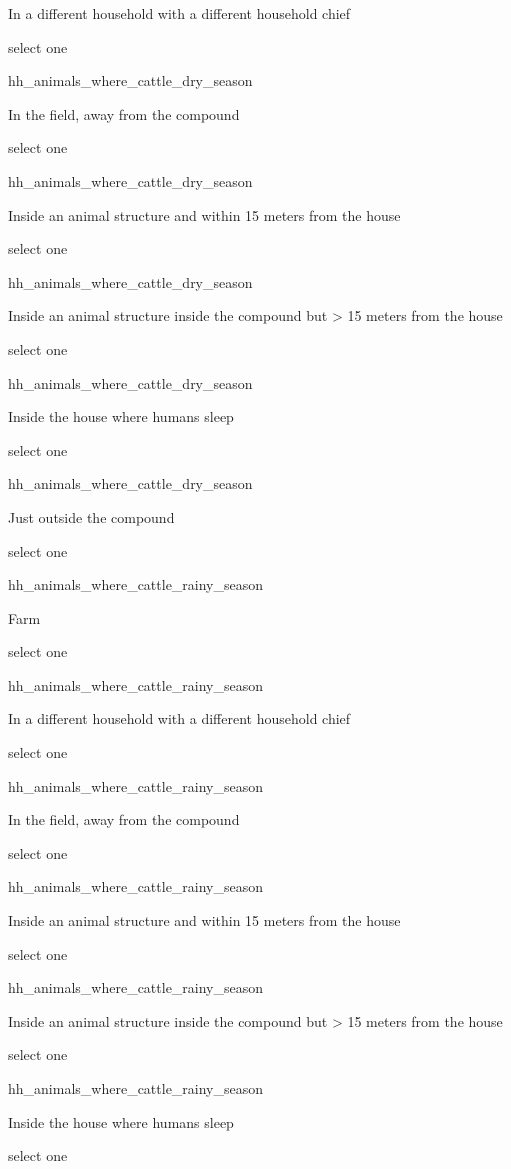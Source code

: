 \documentclass[]{article}
\begin{document}
In a different household with a different household chief

select one

hh\_animals\_where\_cattle\_dry\_season

In the field, away from the compound

select one

hh\_animals\_where\_cattle\_dry\_season

Inside an animal structure and within 15 meters from the house

select one

hh\_animals\_where\_cattle\_dry\_season

Inside an animal structure inside the compound but \textgreater{} 15
meters from the house

select one

hh\_animals\_where\_cattle\_dry\_season

Inside the house where humans sleep

select one

hh\_animals\_where\_cattle\_dry\_season

Just outside the compound

select one

hh\_animals\_where\_cattle\_rainy\_season

Farm

select one

hh\_animals\_where\_cattle\_rainy\_season

In a different household with a different household chief

select one

hh\_animals\_where\_cattle\_rainy\_season

In the field, away from the compound

select one

hh\_animals\_where\_cattle\_rainy\_season

Inside an animal structure and within 15 meters from the house

select one

hh\_animals\_where\_cattle\_rainy\_season

Inside an animal structure inside the compound but \textgreater{} 15
meters from the house

select one

hh\_animals\_where\_cattle\_rainy\_season

Inside the house where humans sleep

select one
\end{document}
